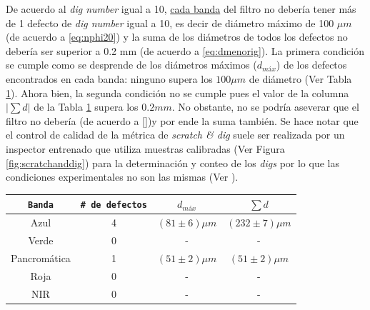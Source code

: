 De acuerdo al \textit{dig number} igual a 10, \underline{cada banda} del filtro no debería tener más de 1 defecto de \textit{dig number} igual a 10, es decir de diámetro máximo de 100 $\mu m$  (de acuerdo a \ref{eq:nphi20}) y la suma de los diámetros de todos los defectos no debería ser superior a 0.2 mm (de acuerdo a \ref{eq:dmenorig}). La primera condición se cumple como se desprende de los diámetros máximos ($d_{máx}$) de los defectos encontrados en cada banda: ninguno supera los $100 \mu m$ de diámetro (Ver Tabla \ref{tabress}). Ahora bien, la segunda condición no se cumple pues  el valor de la columna $|\sum d |$ de la Tabla \ref{tabress} supera los $0.2 mm$. No obstante, no se podría aseverar que el filtro no debería (de acuerdo a \ref{})y por ende la suma también. Se hace notar que el control de calidad de la métrica de \textit{scratch \& dig} suele ser realizada por un inspector entrenado que utiliza muestras calibradas (Ver Figura \ref{fig:scratchanddig}) para la determinación y conteo de los \textit{digs} por lo que las condiciones experimentales no son las mismas (Ver \href{https://bit.ly/34cLMTk}{\faYoutubeSquare}).

\begin{table}[H]
\begin{center}
\begin{tabular}{ |c|c|c|c| }    \toprule
\texttt{Banda} & \texttt{\# de defectos} & \texttt{$d_{máx}$} & \texttt{$\sum d$}\\\midrule
\rowcolor{blue!15} Azul    & 4 & $(81 \pm 6)\mu m$ & $(232 \pm 7)\mu m$   \\ 
\rowcolor{green!50} Verde  & 0 & - & - \\ 
Pancromática& 1 & $(51 \pm 2)\mu m$ & $(51 \pm 2)\mu m$  \\
\rowcolor{red!50} Roja & 0 & -  & -  \\
\rowcolor{maroon!20} NIR & 0 & -  & - \\
\bottomrule
 \hline
\end{tabular}
\end{center}
 \label{tabress}
 \end{table}

